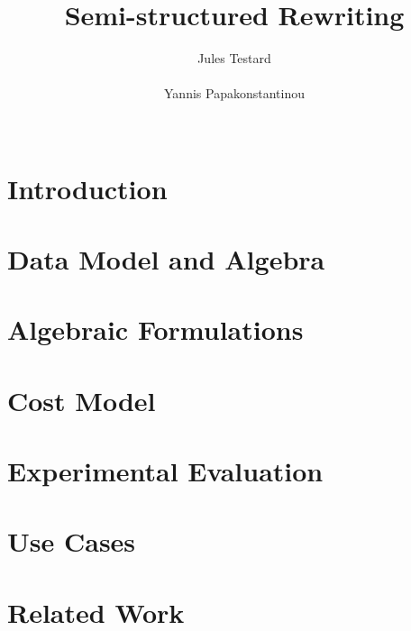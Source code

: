 \documentclass{sig-alternate}
\begin{document}
\title{Semi-structured Rewriting}

    \author{
    \alignauthor
    Jules Testard\\
         \\
    \alignauthor
    Yannis Papakonstantinou\\
         \\
}


\maketitle

\begin{abstract}

\end{abstract}

\section{Introduction}



\section{Data Model and Algebra}



\section{Algebraic Formulations}





% 

\section{Cost Model}



\section{Experimental Evaluation}



\section{Use Cases}



\section{Related Work}




{

}

\appendix


\end{document}
